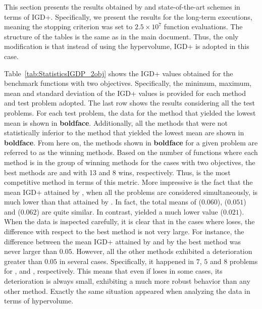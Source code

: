



This section presents the results obtained by \VSDMOEA{} and state-of-the-art schemes in terms of
IGD+\citep{Joel:Inverted_Generational_Distance_Plus}.
%
Specifically, we present the results for the long-term executions, meaning
the stopping criterion was set to $2.5 \times 10^7$ function evaluations.
%
The structure of the tables is the same as in the main document.
%
Thus, the only modification is that instead of using the hypervolume, IGD+ is adopted in this case.

Table~\ref{tab:StatisticsIGDP_2obj} shows the IGD+ values obtained for the benchmark functions with two objectives.
%
Specifically, the minimum, maximum, mean and standard deviation of the IGD+ values is provided 
for each method and test problem adopted.
%
The last row shows the results considering all the test problems.
%
For each test problem, the data for the method that yielded the lowest mean is shown in {\bf boldface}.
%
Additionally, all the methods that were not statistically inferior to the method that yielded
the lowest mean are shown in {\bf boldface}.
%
From here on, the methods shown in {\bf boldface} for a given problem are referred to as the winning methods.
%
Based on the number of functions where each method is in the group of winning methods for the cases 
with two objectives, the best methods are \VSDMOEA{} and \RMOEA{} with 13 and 8 wins, respectively.
%
Thus, \VSDMOEA{} is the most competitive method in terms of this metric.
%
More impressive is the fact that the mean IGD+ attained by \VSDMOEA{}, when all the problems are considered simultaneously, is much lower 
than that attained by \RMOEA{}.
%
In fact, the total means of \RMOEA{} ($0.060$), \NSGAII{} ($0.051$) and \MOEAD{} ($0.062$) are quite similar.
%
In contrast, \VSDMOEA{} yielded a much lower value ($0.021$).
%
When the data is inspected carefully, it is clear that in the cases where \VSDMOEA{} loses, the difference with respect to the
best method is not very large.
%
For instance, the difference between the mean IGD+ attained by \VSDMOEA{} and by the best method was never larger
than $0.05$.
%
However, all the other methods exhibited a deterioration greater than $0.05$ in several cases.
%
Specifically, it happened in $7$, $5$ and $8$ problems for \MOEAD{}, \NSGAII{} and \RMOEA{}, respectively.
%
This means that even if \VSDMOEA{} loses in some cases, its deterioration is always small, exhibiting a much more 
robust behavior than any other method.
%
Exactly the same situation appeared when analyzing the data in terms of hypervolume.

